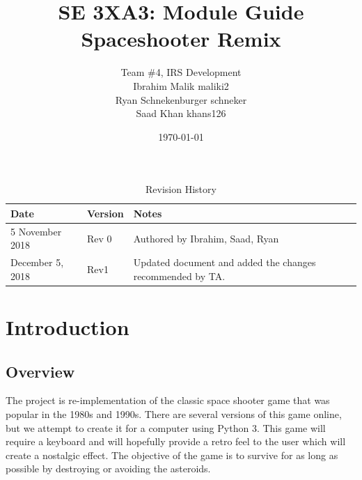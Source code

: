 \documentclass[12pt, titlepage]{article}
\title{SE 3XA3: Module Guide\\Spaceshooter Remix}
\author{Team \#4, IRS Development
        \\ Ibrahim Malik maliki2
        \\ Ryan Schnekenburger schneker
        \\ Saad Khan khans126
}
\date{\today}
\begin{document}
\maketitle

\tableofcontents
\listoftables
\listoffigures

\newpage

\begin{table}[hp]
\caption{Revision History} \label{TblRevisionHistory}
\begin{tabularx}{\textwidth}{llX}
\toprule {\bf Date} & {\bf Version} & {\bf Notes}\\
\midrule
5 November 2018 & Rev 0 & Authored by Ibrahim, Saad, Ryan\\
December 5, 2018 & Rev1 & Updated document and added the changes recommended by TA.\\
\bottomrule
\end{tabularx}
\end{table}

\newpage


\section{Introduction}

\subsection{Overview}
The project is re-implementation of the classic space shooter game that was popular in the 1980s and 1990s. There are several versions of this game online, but we attempt to create it for a computer using Python 3. This game will require a keyboard and will hopefully provide a retro feel to the user which will create a nostalgic effect. The objective of the game is to survive for as long as possible by destroying or avoiding the asteroids.
\end{document}
